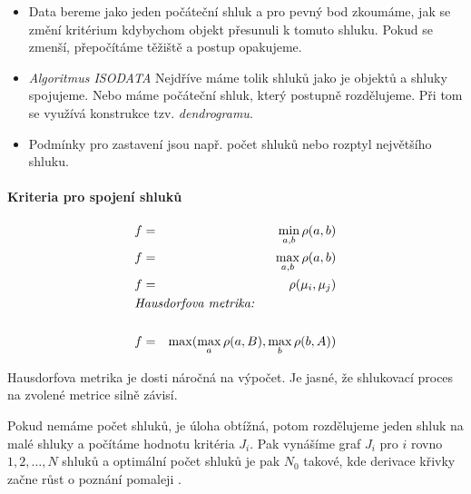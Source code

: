 \begin{itemize}
\item Data bereme jako jeden počáteční shluk a pro pevný bod zkoumáme, jak se změní kritérium kdybychom
objekt přesunuli k tomuto shluku. Pokud se zmenší, přepočítáme těžiště a postup opakujeme.
\item {\em Algoritmus ISODATA} Nejdříve máme tolik shluků jako je objektů a shluky spojujeme. Nebo máme počáteční shluk,
který postupně rozdělujeme. Při tom se využívá konstrukce tzv. {\em dendrogramu}.
\item Podmínky pro zastavení jsou např. počet shluků nebo rozptyl největšího shluku.
\end{itemize}

\paragraph{Kriteria pro spojení shluků}

\begin{eqnarray}
f&=&\min\limits_{a,b}\rho(a,b)\\
f&=&\max\limits_{a,b}\rho(a,b)\\
f&=&\rho(\mu_i,\mu_j)\\
\noalign{\hbox{{\em Hausdorfova metrika: }}}\nonumber\\ 
f&=&\max(\max\limits_a\rho(a,B),\max\limits_b\rho(b,A))
\end{eqnarray}

Hausdorfova metrika je dosti náročná na výpočet. Je jasné, že shlukovací proces na zvolené metrice silně závisí.

Pokud nemáme počet shluků, je úloha obtížná, potom rozdělujeme jeden shluk na malé shluky a počítáme hodnotu
kritéria $J_i$. Pak vynášíme graf $J_i$ pro $i$ rovno $1,2,\dots,N$ shluků a optimální počet shluků je pak $N_0$
takové, kde derivace křivky začne růst o poznání pomaleji .


